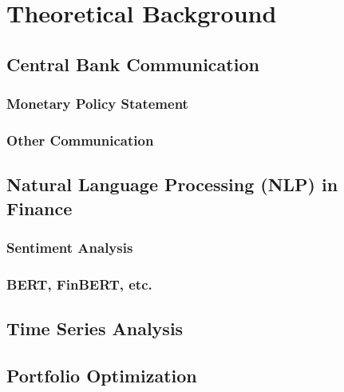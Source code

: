 \chapter{Theoretical Background}
\section{Central Bank Communication}

\subsection{Monetary Policy Statement}

\subsection{Other Communication} %

\section{Natural Language Processing (NLP) in Finance}

\subsection{Sentiment Analysis}

\subsection{BERT, FinBERT, etc.}

\section{Time Series Analysis}

\section{Portfolio Optimization}
